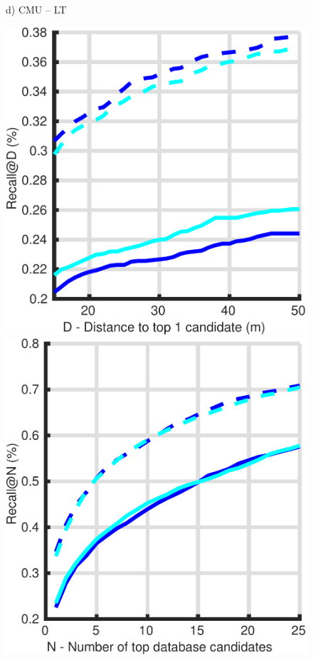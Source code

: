 \begin{figure}
\begin{minipage}{0.16\linewidth}
		d) CMU -- LT
	\end{minipage}
	\begin{minipage}{0.16\linewidth}
		\center \scriptsize
		\includegraphics[width=\linewidth]{plot/night_ft/Results_cmu_snow/distance}	
		
		\includegraphics[width=\linewidth]{plot/night_ft/Results_cmu_snow/recall}
		

\end{minipage}
\end{figure}
